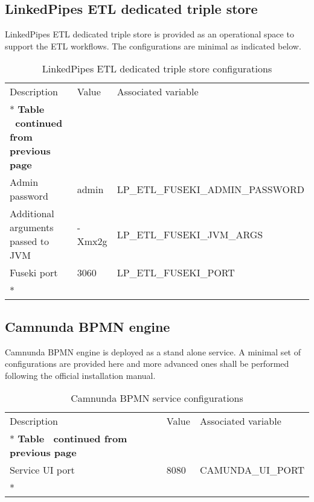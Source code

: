 	\subsection{LinkedPipes ETL dedicated triple store}
	
	LinkedPipes ETL dedicated triple store is provided as an operational space to support the ETL workflows. The configurations are minimal as indicated below. 
	
	\begin{longtable}[c]{@{}p{4cm}p{2cm}l@{}}
		\toprule
		Description & Value & Associated variable \\* \midrule
		\endfirsthead
		\multicolumn{3}{c}%
		{{\bfseries Table \thetable\ continued from previous page}} \\
		\endhead
		\bottomrule
		\endfoot
		\endlastfoot
		Admin password & admin & LP\_ETL\_FUSEKI\_ADMIN\_PASSWORD \\
		Additional arguments passed to JVM & -Xmx2g & LP\_ETL\_FUSEKI\_JVM\_ARGS \\
		Fuseki port & 3060 & LP\_ETL\_FUSEKI\_PORT \\* \bottomrule
		\caption{LinkedPipes ETL dedicated triple store configurations}
		\label{tab:my-table6}\\
	\end{longtable}
	
	\subsection{Camnunda BPMN engine}

	Camnunda BPMN engine is deployed as a stand alone service.  A minimal set of configurations are provided here and more advanced ones shall be performed following the official installation manual. 
	
 	\begin{longtable}[c]{@{}p{4cm}p{2cm}l@{}}
	 	\toprule
	 	Description & Value & Associated variable \\* \midrule
	 	\endfirsthead
	 	\multicolumn{3}{c}%
	 	{{\bfseries Table \thetable\ continued from previous page}} \\
	 	\endhead
	 	\bottomrule
	 	\endfoot
	 	\endlastfoot
	 	Service UI port & 8080 & CAMUNDA\_UI\_PORT \\* \bottomrule
	 	\caption{Camnunda BPMN service configurations}
	 	\label{tab:my-table9}\\
	 \end{longtable}
	
	